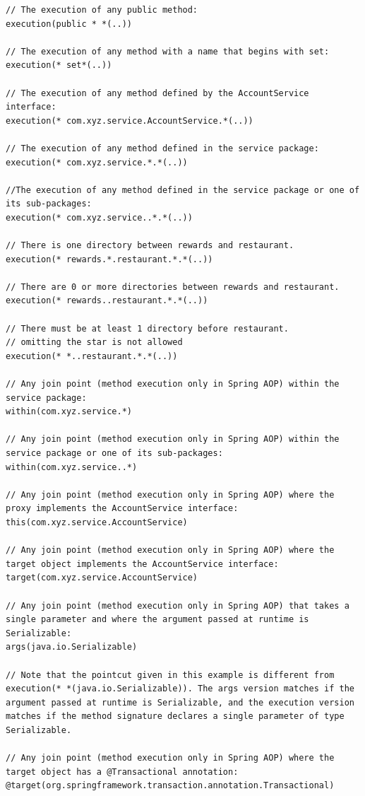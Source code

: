 \documentclass{scrartcl}
\begin{document}
\begin{lstlisting}
// The execution of any public method:
execution(public * *(..))

// The execution of any method with a name that begins with set:
execution(* set*(..))

// The execution of any method defined by the AccountService interface:
execution(* com.xyz.service.AccountService.*(..))

// The execution of any method defined in the service package:
execution(* com.xyz.service.*.*(..))

//The execution of any method defined in the service package or one of its sub-packages:
execution(* com.xyz.service..*.*(..))

// There is one directory between rewards and restaurant.
execution(* rewards.*.restaurant.*.*(..))

// There are 0 or more directories between rewards and restaurant.
execution(* rewards..restaurant.*.*(..))

// There must be at least 1 directory before restaurant.
// omitting the star is not allowed
execution(* *..restaurant.*.*(..))

// Any join point (method execution only in Spring AOP) within the service package:
within(com.xyz.service.*)

// Any join point (method execution only in Spring AOP) within the service package or one of its sub-packages:
within(com.xyz.service..*)

// Any join point (method execution only in Spring AOP) where the proxy implements the AccountService interface:
this(com.xyz.service.AccountService)

// Any join point (method execution only in Spring AOP) where the target object implements the AccountService interface:
target(com.xyz.service.AccountService)

// Any join point (method execution only in Spring AOP) that takes a single parameter and where the argument passed at runtime is Serializable:
args(java.io.Serializable)

// Note that the pointcut given in this example is different from execution(* *(java.io.Serializable)). The args version matches if the argument passed at runtime is Serializable, and the execution version matches if the method signature declares a single parameter of type Serializable.

// Any join point (method execution only in Spring AOP) where the target object has a @Transactional annotation:
@target(org.springframework.transaction.annotation.Transactional)


\end{lstlisting}
\end{document}
